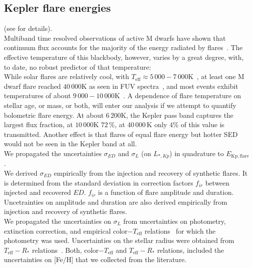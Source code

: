 \documentclass{aa}
\begin{document}
\subsection{Kepler flare energies}
(see  for details).
\\
Multiband time resolved observations of active M dwarfs have shown that continuum flux accounts for the majority  of the energy radiated by flares~\citep{kowalski_time-resolved_2013}. %
The effective temperature of this blackbody, however, varies by a great degree, with, to date, no robust predictor of that temperature:
\\
While solar flares are relatively cool, with \mbox{$T_\mathrm{eff}\approx5\,000-7\,000 $\;K}~\citep{kleint_solarstellarwlf_2016, kerr_solarstellarwlf_2014, watanabe_solarstellarwlf_2013, namekata_solarstellarwlf_2017}, at least one M dwarf flare reached $40\,000$\;K as seen in FUV spectra~\citep{froning_40000_2019}, and most events exhibit temperatures of about $9\,000-10\,000$\;K~\citep{1992ApJS...78..565H, kretzschmar_sun_2011, shibayama_superflares_2013}.
A dependence of flare temperature on stellar age, or mass, or both, will enter our analysis if we attempt to quantify bolometric flare energy. At about $6\,200$\;K, the Kepler pass band captures the largest flux fraction, at $10\,000$\;K $72\,\%$, at $40\,000$\,K only $4\%$ of this value is transmitted. Another effect is that flares of equal flare energy but hotter SED would not be seen in the Kepler band at all.
\\
We propagated the uncertainties $\sigma_{ED}$ and $\sigma_L$ (on $L_{*,Kp}$) in quadrature to $E_\mathrm{Kp,flare}$.
\\
We derived $\sigma_{ED}$ empirically from the injection and recovery of synthetic flares. It is determined from the standard deviation in correction factors $f_{ir}$ between injected and recovered $ED$. $f_{ir}$ is a function of flare amplitude and duration. Uncetrainties on amplitude and duration are also derived empirically from injection and recovery of synthetic flares.
\\
We propagated the uncertainties on $\sigma_L$ from uncertainties on photometry, extinction correction, and empirical color$-T_\mathrm{eff}$ relations~\citep{mann_erratum_2016} for which the photometry was used. Uncertainties on the stellar radius were obtained from $T_\mathrm{eff} - R_*$ relations~\citep{mann_erratum_2016}. Both, color$-T_\mathrm{eff}$ and $T_\mathrm{eff} - R_*$ relations, included the uncertainties on [Fe/H] that we collected from the literature.
\end{document}
